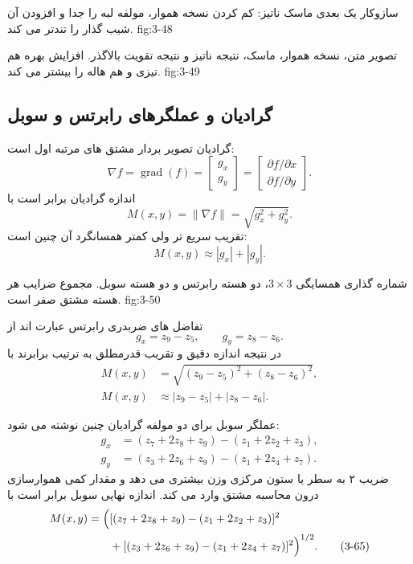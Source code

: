 {سازوکار یک بعدی ماسک ناتیز: کم کردن نسخه هموار، مولفه لبه را جدا و افزودن
آن شیب گذار را تندتر می کند.}
{fig:3-48}

{تصویر متن، نسخه هموار، ماسک، نتیجه ناتیز و نتیجه تقویت بالاگذر. افزایش بهره
هم تیزی و هم هاله را بیشتر می کند.}
{fig:3-49}

\subsection{گرادیان و عملگرهای رابرتس و سوبل}

گرادیان تصویر بردار مشتق های مرتبه اول است:
\begin{equation}
  \nabla f=\operatorname{grad}(f)=
  \begin{bmatrix}g_x\\g_y\end{bmatrix}=
  \begin{bmatrix}\partial f/\partial x\\\partial f/\partial y\end{bmatrix}.
  \tag{3-57}\label{eq:3-57}
\end{equation}
اندازه گرادیان برابر است با
\begin{equation}
  M(x,y)=\|\nabla f\|=\sqrt{g_x^2+g_y^2}.
  \tag{3-58}\label{eq:3-58}
\end{equation}
تقریب سریع تر ولی کمتر همسانگرد آن چنین است:
\begin{equation}
  M(x,y)\approx |g_x|+|g_y|.
  \tag{3-59}\label{eq:3-59}
\end{equation}

{شماره گذاری همسایگی \(3\times3\)، دو هسته رابرتس و دو هسته سوبل. مجموع
ضرایب هر هسته مشتق صفر است.}
{fig:3-50}

تفاضل های ضربدری رابرتس عبارت اند از
\begin{equation}
  g_x=z_9-z_5,\qquad g_y=z_8-z_6.
  \tag{3-60}\label{eq:3-60}
\end{equation}
در نتیجه اندازه دقیق و تقریب قدرمطلق به ترتیب برابرند با
\begin{align}
  M(x,y)&=\sqrt{(z_9-z_5)^2+(z_8-z_6)^2},
  \tag{3-61}\label{eq:3-61}\\
  M(x,y)&\approx |z_9-z_5|+|z_8-z_6|.
  \tag{3-62}\label{eq:3-62}
\end{align}

عملگر سوبل برای دو مولفه گرادیان چنین نوشته می شود:
\begin{align}
  g_x&=(z_7+2z_8+z_9)-(z_1+2z_2+z_3),
  \tag{3-63}\label{eq:3-63}\\
  g_y&=(z_3+2z_6+z_9)-(z_1+2z_4+z_7).
  \tag{3-64}\label{eq:3-64}
\end{align}
ضریب ۲ به سطر یا ستون مرکزی وزن بیشتری می دهد و مقدار کمی هموارسازی درون
محاسبه مشتق وارد می کند. اندازه نهایی سوبل برابر است با
\begin{align}
M(x,y)=\Big(&[(z_7+2z_8+z_9)-(z_1+2z_2+z_3)]^2\notag\\
&+[(z_3+2z_6+z_9)-(z_1+2z_4+z_7)]^2\Big)^{1/2}.
\tag{3-65}\label{eq:3-65}
\end{align}

